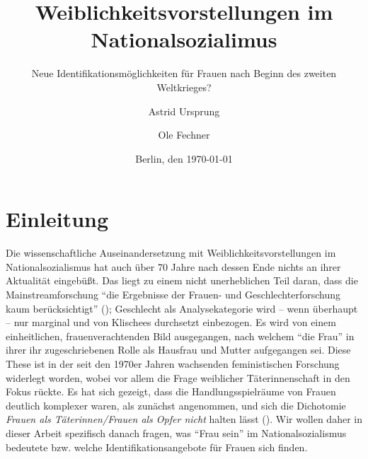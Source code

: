 \documentclass[12pt, titlepage=true, toc=bib]{scrartcl}
\begin{document}
\titlehead{Freie Universität Berlin\\
			FB Politik- und Sozialwissenschaften\\
			Otto-Suhr-Institut\\
			Sommersemester 2016\\
			{[}GEND{]} Rechtsextremismus und Gender: Geschichte und Gegenwart (15095)\\
			Carmen Altmeyer, Till Herold}
\author{Astrid Ursprung\and Ole Fechner}
\title{Weiblichkeitsvorstellungen im Nationalsozialimus}
\subtitle{Neue Identifikationsmöglichkeiten für Frauen nach Beginn des zweiten Weltkrieges?}
\date{\normalsize{Berlin, den \today}}

\publishers{\normalsize{Goltzstr. 16\hfill Gerichtstr. 13\\
							 10781 Berlin\hfill 13347 Berlin\\
							 ursprung@posteo.de\hfill ole.fechner@fu-berlin.de\\
							 Matrikelnummer: 4768210\hfill Matrikelnummer: 4757766\\
							 BA Politikwissenschaft\hfill BA Politikwissenschaft}}


\maketitle[0]

\newpage
\thispagestyle{empty}
\tableofcontents

\newpage
\setcounter{page}{1}

\section{Einleitung}

Die wissenschaftliche Auseinandersetzung mit Weiblichkeitsvorstellungen im Nationalsozialismus hat auch über 70 Jahre nach dessen Ende nichts an ihrer Aktualität eingebüßt. Das liegt zu einem nicht unerheblichen Teil daran, dass die Mainstreamforschung "`die Ergebnisse der Frauen- und Geschlechterforschung kaum berücksichtigt"' (\cite[9]{frietsch_nationalsozialismus_2015}); Geschlecht als Analysekategorie wird -- wenn überhaupt -- nur marginal und von Klischees durchsetzt einbezogen. Es wird von einem einheitlichen, frauenverachtenden Bild ausgegangen, nach welchem "`die Frau"' in ihrer ihr zugeschriebenen Rolle als Hausfrau und Mutter aufgegangen sei. Diese These ist in der seit den 1970er Jahren wachsenden feministischen Forschung widerlegt worden, wobei vor allem die Frage weiblicher Täterinnenschaft in den Fokus rückte. Es hat sich gezeigt, dass die Handlungsspielräume von Frauen deutlich komplexer waren, als zunächst angenommen, und sich die Dichotomie \textit{Frauen als Täterinnen/Frauen als Opfer nicht} halten lässt (\cite[10-11]{frietsch_nationalsozialismus_2015}). Wir wollen daher in dieser Arbeit spezifisch danach fragen, was "`Frau sein"' im Nationalsozialismus bedeutete bzw. welche Identifikationsangebote für Frauen sich finden.
\end{document}
